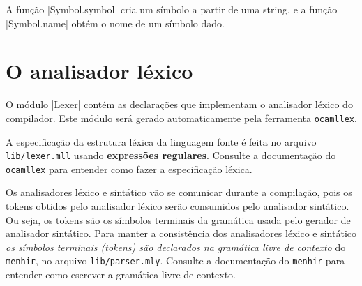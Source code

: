 \documentclass[a4paper,11pt,brazil]{article}
\begin{document}
A função \pyginline|Symbol.symbol| cria um símbolo a partir de uma
string, e a função \pyginline|Symbol.name| obtém o nome de um símbolo
dado.


\section{O  analisador léxico}

O módulo \pyginline|Lexer| contém as declarações que implementam o
analisador léxico do compilador. Este módulo será gerado
automaticamente pela ferramenta \texttt{ocamllex}.

A especificação da estrutura léxica da linguagem fonte é feita no
arquivo \texttt{lib/lexer.mll} usando \textbf{expressões
  regulares}. Consulte a
\href{https://ocaml.org/releases/4.12/htmlman/lexyacc.html}{documentação
  do \texttt{ocamllex}} para entender como fazer a especificação
léxica.

Os analisadores léxico e sintático vão se comunicar durante a
compilação, pois os tokens obtidos pelo analisador léxico serão
consumidos pelo analisador sintático. Ou seja, os tokens são os
símbolos terminais da gramática usada pelo gerador de analisador
sintático. Para manter a consistência dos analisadores léxico e
sintático \emph{os símbolos terminais (tokens) são declarados na
  gramática livre de contexto} do \texttt{menhir}, no arquivo
\texttt{lib/parser.mly}. Consulte a documentação do \texttt{menhir}
para entender como escrever a gramática livre de contexto.
\end{document}
